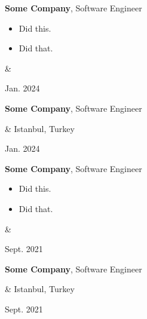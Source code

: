 \documentclass[10pt, letterpaper]{article}
\newenvironment{highlights}{
        \begin{itemize}[
                topsep=0pt,
                parsep=0.10 cm,
                partopsep=0pt,
                itemsep=0pt,
                after=\relax,
                leftmargin=0.4 cm + 3pt
            ]
    }{
        \end{itemize}
    } %
\let\originalTabularx\tabularx
\let\originalEndTabularx\endtabularx
\renewenvironment{tabularx}{\bgroup\centering\originalTabularx}{\originalEndTabularx\par\egroup}
\begin{document}
        \vspace{0.2 cm}
        \begin{tabularx}{
            \textwidth-0.4 cm-0.13cm
        }{
            K{0.2 cm}
            R{4.1 cm}
        }
            \textbf{Some Company}, Software Engineer

            \vspace{0.10 cm}

            \begin{highlights}
                \item Did this.
                \item Did that.
            \end{highlights}
            &
            

            Jan. 2024
        \end{tabularx}

        \vspace{0.2 cm}
        \begin{tabularx}{
            \textwidth-0.4 cm-0.13cm
        }{
            K{0.2 cm}
            R{4.1 cm}
        }
            \textbf{Some Company}, Software Engineer

            \vspace{0.10 cm}

            &
            Istanbul, Turkey

            Jan. 2024
        \end{tabularx}

        \vspace{0.2 cm}
        \begin{tabularx}{
            \textwidth-0.4 cm-0.13cm
        }{
            K{0.2 cm}
            R{4.1 cm}
        }
            \textbf{Some Company}, Software Engineer

            \vspace{0.10 cm}

            \begin{highlights}
                \item Did this.
                \item Did that.
            \end{highlights}
            &
            

            Sept. 2021
        \end{tabularx}

        \vspace{0.2 cm}
        \begin{tabularx}{
            \textwidth-0.4 cm-0.13cm
        }{
            K{0.2 cm}
            R{4.1 cm}
        }
            \textbf{Some Company}, Software Engineer

            \vspace{0.10 cm}

            &
            Istanbul, Turkey

            Sept. 2021
        \end{tabularx}
\end{document}
